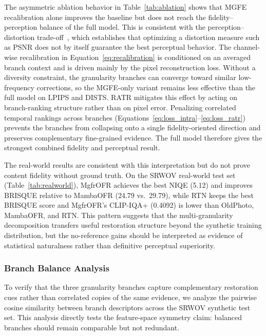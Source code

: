\documentclass[symmetry,article,submit,pdftex,moreauthors]{Definitions/mdpi}
\begin{document}
The asymmetric ablation behavior in Table~\ref{tab:ablation} shows that MGFE recalibration alone improves the baseline but does not reach the fidelity--perception balance of the full model. This is consistent with the perception--distortion trade-off~\cite{blau2018perception}, which establishes that optimizing a distortion measure such as PSNR does not by itself guarantee the best perceptual behavior. The channel-wise recalibration in Equation~\eqref{eq:recalibration} is conditioned on an averaged branch context and is driven mainly by the pixel reconstruction loss. Without a diversity constraint, the granularity branches can converge toward similar low-frequency corrections, so the MGFE-only variant remains less effective than the full model on LPIPS and DISTS. RATR mitigates this effect by acting on branch-ranking structure rather than on pixel error. Penalizing correlated temporal rankings across branches (Equations~\eqref{eq:loss_intra}--\eqref{eq:loss_ratr}) prevents the branches from collapsing onto a single fidelity-oriented direction and preserves complementary fine-grained evidence. The full model therefore gives the strongest combined fidelity and perceptual result.

The real-world results are consistent with this interpretation but do not prove content fidelity without ground truth. On the SRWOV real-world test set (Table~\ref{tab:realworld}), MgfrOFR achieves the best NIQE (5.12) and improves BRISQUE relative to MambaOFR (24.79 vs.\ 29.79), while RTN keeps the best BRISQUE score and MgfrOFR's CLIP-IQA+ (0.4092) is lower than OldPhoto, MambaOFR, and RTN. This pattern suggests that the multi-granularity decomposition transfers useful restoration structure beyond the synthetic training distribution, but the no-reference gains should be interpreted as evidence of statistical naturalness rather than definitive perceptual superiority.

\subsubsection{Branch Balance Analysis}
\label{subsec:branch_analysis}

To verify that the three granularity branches capture complementary restoration cues rather than correlated copies of the same evidence, we analyze the pairwise cosine similarity between branch descriptors across the SRWOV synthetic test set. This analysis directly tests the feature-space symmetry claim: balanced branches should remain comparable but not redundant.
\end{document}
